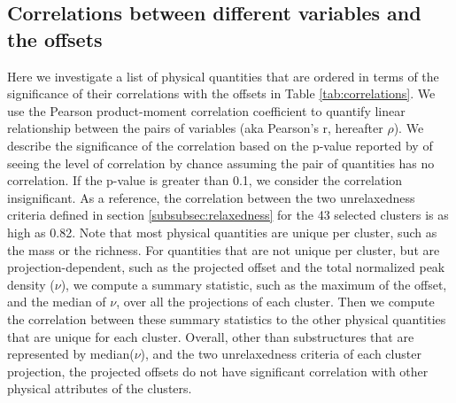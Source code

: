 \subsection{Correlations between different variables and the offsets}
\label{subsec:correlations}
Here we investigate a list of physical quantities that are ordered in terms of
the significance of their correlations with the offsets in Table \ref{tab:correlations}. 
We use the Pearson product-moment correlation coefficient to quantify linear 
relationship between the pairs of variables
(aka Pearson's r,  hereafter $\rho$).
We describe the significance of the correlation 
based on the p-value reported by {} of seeing the level of 
correlation by chance assuming the pair of 
quantities has no correlation. If the p-value is greater than 0.1, we consider the
correlation insignificant.
As a reference, the correlation between the 
two unrelaxedness criteria defined in section \ref{subsubsec:relaxedness}
for the 43 selected clusters is as high as 0.82. 
Note that most physical quantities are unique per cluster, such as the mass or
the richness.
For quantities that are not unique per cluster, but are projection-dependent,
such as the projected offset and the total normalized peak density ($\nu$), 
we compute a summary statistic, such as the
maximum of the offset, and the median of $\nu$, over all the projections of
each cluster. 
Then we compute the correlation between these summary statistics to the other physical quantities that
are unique for each cluster.
Overall, other than substructures that are represented by median($\nu$), and the two
unrelaxedness criteria of each cluster
projection, the projected offsets do not have significant correlation 
with other physical attributes of the clusters.


